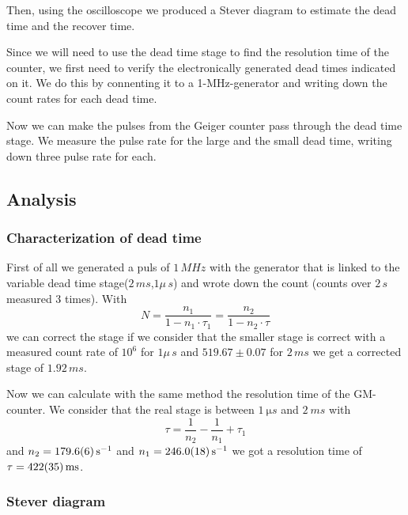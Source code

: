 Then, using the oscilloscope we produced a Stever diagram to estimate the dead time and the recover time.

Since we will need to use the dead time stage to find the resolution time of the counter, we first need to verify the electronically generated dead times indicated on it. We do this by connenting it to a 1-MHz-generator and writing down the count rates for each dead time.

Now we can make the pulses from the Geiger counter pass through the dead time stage. We measure the pulse rate for the large and the small dead time, writing down three pulse rate for each.

\subsection{Analysis}

\subsubsection{Characterization of dead time}

First of all we generated a puls of $1\,MHz$ with the generator
that is linked to the variable dead time stage($2\,ms$,$1\mu\,s$) and wrote down the count (counts over $2\,s$ measured $3$ times).
With
\begin{equation}
N =\frac{n_1}{1-n_1\cdot\tau_1}=\frac{n_2}{1-n_2\cdot\tau}
\end{equation}
we can correct the stage if we consider that the smaller stage is correct 
with a measured count rate of $10^6$ for $1\mu\,s$ and 
$519.67\pm0.07$ for $2\,ms$ we get a corrected stage of $1.92\,ms$.

Now we can calculate with the same method the resolution time of the GM-counter.
We consider that the real stage is between $\SI{1}{\micro s}$ and $\SI{2}{ms}$ with
\begin{equation}
\tau =\frac{1}{n_2}-\frac{1}{n_1}+\tau_1
\end{equation}
and $n_2=\SI{179.6\pm0.6}{s^{-1}}$ and $n_1=\SI{246.0\pm1.8}{s^{-1}}$ we got a resolution time of $\tau=\SI{422\pm35}{ms}$.

\subsubsection{Stever diagram}

